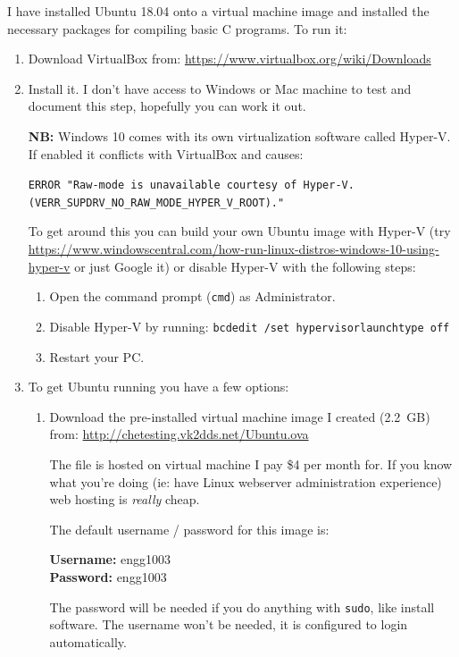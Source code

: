 \documentclass{lab}
\begin{document}
I have installed Ubuntu 18.04 onto a virtual machine image and installed the necessary packages for compiling basic C programs. To run it:

\begin{enumerate}
\item Download VirtualBox from: \url{https://www.virtualbox.org/wiki/Downloads}
\item Install it. I don't have access to Windows or Mac machine to test and document this step, hopefully you can work it out.

\textbf{NB:} Windows 10 comes with its own virtualization software called Hyper-V. If enabled it conflicts with VirtualBox and causes:

\texttt{ERROR "Raw-mode is unavailable courtesy of Hyper-V.\\	 (VERR\_SUPDRV\_NO\_RAW\_MODE\_HYPER\_V\_ROOT)."}

To get around this you can build your own Ubuntu image with Hyper-V (try \url{https://www.windowscentral.com/how-run-linux-distros-windows-10-using-hyper-v} or just Google it) or disable Hyper-V with the following steps:

	\begin{enumerate}
		\item Open the command prompt (\texttt{cmd}) as Administrator.
		\item Disable Hyper-V by running: \texttt{bcdedit /set hypervisorlaunchtype off}
		\item Restart your PC.
	\end{enumerate}

\item To get Ubuntu running you have a few options:
	\begin{enumerate}
		\item Download the pre-installed virtual machine image I created (2.2~GB) from: \url{http://chetesting.vk2dds.net/Ubuntu.ova}

The file is hosted on virtual machine I pay \$4 per month for. If you know what you're doing (ie: have Linux webserver administration experience) web hosting is \textit{really} cheap.

The default username / password for this image is:

\textbf{Username:} engg1003\\
\textbf{Password:} engg1003

The password will be needed if you do anything with \texttt{sudo}, like install software. The username won't be needed, it is configured to login automatically.


\end{enumerate}
\end{enumerate}
\end{document}

